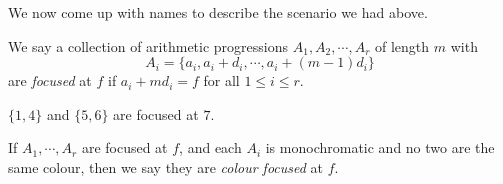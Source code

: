 \documentclass[a4paper]{article}
\begin{document}
We now come up with names to describe the scenario we had above.
\begin{defi}
  We say a collection of arithmetic progressions $A_1, A_2, \cdots, A_r$ of length $m$ with
  \[
    A_i = \{a_i, a_i + d_i, \cdots, a_i + (m - 1) d_i\}
  \]
  are \emph{focused} at $f$ if $a_i + m d_i = f$ for all $1 \leq i \leq r$.
\end{defi}

\begin{eg}
  $\{1, 4\}$ and $\{5, 6\}$ are focused at $7$.
\end{eg}

\begin{defi}
  If $A_1, \cdots, A_r$ are focused at $f$, and each $A_i$ is monochromatic and no two are the same colour, then we say they are \emph{colour focused} at $f$.
\end{defi}
\end{document}
